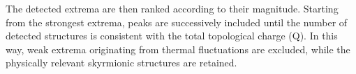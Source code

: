 The detected extrema are then ranked according to their magnitude. Starting from the strongest extrema, peaks are successively included until the number of detected structures is consistent with the total topological charge (Q). In this way, weak extrema originating from thermal fluctuations are excluded, while the physically relevant skyrmionic structures are retained.






%
%
%
%
%
%
%
%
